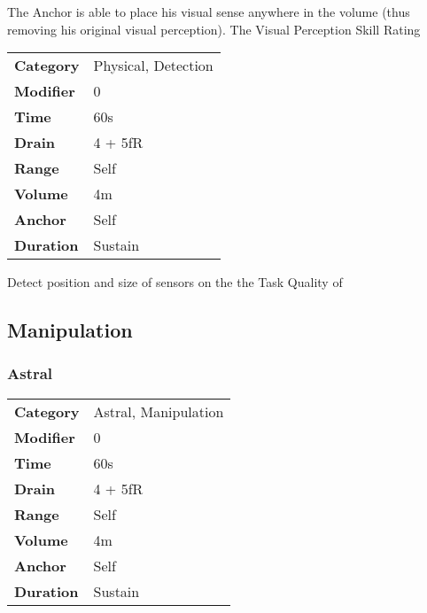 \hfil

The Anchor is able to place his visual sense
anywhere in the volume (thus removing his original visual perception).
The Visual Perception Skill
Rating


\begin{tabular}{ll}
    \textbf{Category} & Physical, Detection \\
    \textbf{Modifier} & 0                   \\
    \textbf{Time}     & 60s                 \\
    \textbf{Drain}    & 4 + 5fR             \\
    \textbf{Range}    & Self                \\
    \textbf{Volume}   & 4m                  \\
    \textbf{Anchor}   & Self                \\
    \textbf{Duration} & Sustain             \\
\end{tabular}

\hfil


Detect position and size of sensors on the the Task
Quality of

\subsection{Manipulation}

\subsubsection{Astral}


\begin{tabular}{ll}
    \textbf{Category} & Astral, Manipulation \\
    \textbf{Modifier} & 0                    \\
    \textbf{Time}     & 60s                  \\
    \textbf{Drain}    & 4 + 5fR              \\
    \textbf{Range}    & Self                 \\
    \textbf{Volume}   & 4m                   \\
    \textbf{Anchor}   & Self                 \\
    \textbf{Duration} & Sustain              \\
\end{tabular}

